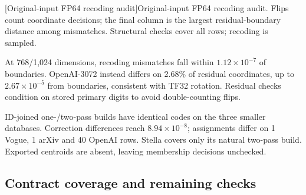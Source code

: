 \par\medskip\noindent\begin{minipage}{\linewidth}
\centering\captionsetup{hypcap=false}
[Original-input FP64 recoding audit]{Original-input FP64 recoding audit. Flips count coordinate
decisions; the final column is the largest residual-boundary distance
among mismatches. Structural checks cover all rows; recoding is sampled.}
\label{tab:4-representation-audit}
\scriptsize\setlength{\tabcolsep}{3pt}

\end{minipage}\par\medskip

At 768/1,024 dimensions, recoding mismatches fall within $1.12\times10^{-7}$ of boundaries. OpenAI-3072 instead differs on 2.68\% of residual coordinates, up to $2.67\times10^{-5}$ from boundaries, consistent with TF32 rotation. Residual checks condition on stored primary digits to avoid double-counting flips.

ID-joined one-/two-pass builds have identical codes on the three smaller databases. Correction differences reach $8.94\times10^{-8}$; assignments differ on 1 Vogue, 1 arXiv and 40 OpenAI rows. Stella covers only its natural two-pass build. Exported centroids are absent, leaving membership decisions unchecked.

\subsection{Contract coverage and remaining checks}
\suppressfloats[t]

